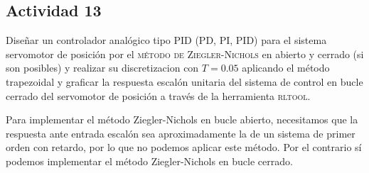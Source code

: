 \newpage
\subsection{Actividad 13}
Diseñar un controlador analógico tipo PID (PD, PI, PID) para el
sistema servomotor de posición por el \textsc{método de
Ziegler-Nichols} en abierto y cerrado (si son posibles) y realizar su
discretizacion con $T=0.05$ aplicando el método trapezoidal y graficar
la respuesta escalón unitaria del sistema de control en bucle cerrado
del servomotor de posición a través de la herramienta \textsc{rltool}.

Para implementar el método Ziegler-Nichols en bucle abierto,
necesitamos que la respuesta ante entrada escalón sea aproximadamente
la de un sistema de primer orden con retardo, por lo que no podemos
aplicar este método.  Por el contrario sí podemos implementar el
método Ziegler-Nichols en bucle cerrado.

